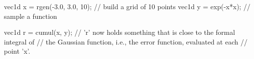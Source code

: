 \begin{example}
\begin{cppcode}
vec1d x = rgen(-3.0, 3.0, 10); // build a grid of 10 points
vec1d y = exp(-x*x);           // sample a function

vec1d r = cumul(x, y);
// 'r' now holds something that is close to the formal integral of
// the Gaussian function, i.e., the error function, evaluated at each
// point 'x'.
\end{cppcode}
\end{example}
